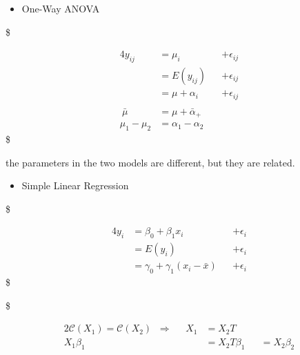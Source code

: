 \documentclass[
]{book}
\providecommand{\tightlist}{%
  \setlength{\itemsep}{0pt}\setlength{\parskip}{0pt}}
\begin{document}
{{{\begin{itemize}
\tightlist
\item
  One-Way ANOVA
\end{itemize}

\$

\begin{alignat}{4}



y_{ij} &= \mu_i &&+ \epsilon_{ij} \\
&= E(y_{ij}) &&+ \epsilon_{ij} \\


&= \mu + \alpha_i &&+ \epsilon_{ij} \\

\\\

\bar \mu &= \mu + \bar \alpha_+ \\


\mu_1 - \mu_2 &= \alpha_1 - \alpha_2



\end{alignat}
\$

the parameters in the two models are different, but they are related.

\begin{itemize}
\tightlist
\item
  Simple Linear Regression
\end{itemize}

\$

\begin{alignat}{4}
y_i & = \beta_0 + \beta_1 x_i &&+\epsilon_i

\\


& = E(y_i) &&+\epsilon_i
 
\\

& = \gamma_0 + \gamma_1(x_i - \bar x) &&+\epsilon_i


\end{alignat}
\$

\$

\begin{alignat}{2}

\mathcal{C}(X_1) = \mathcal{C}(X_2) \; \; \Longrightarrow \; \;\; \; \; X_1 &= X_2 T


\\

X_1 \beta_1 &= X_2 T \beta_1 && = X_2 \beta_2

\\


\end{alignat}}}}
\end{document}
